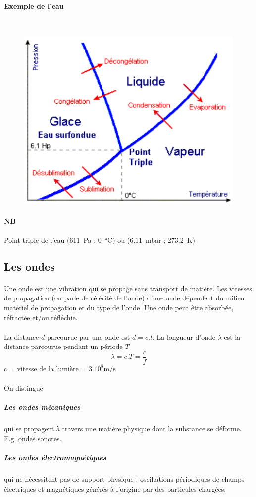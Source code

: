 \documentclass{article}
\begin{document}
            \paragraph{Exemple de l'eau}
            \
            \begin{figure}[H]
            \centering
                \includegraphics[width=0.45\linewidth]{./images/015-diagramme-phase-eau.png}
            \end{figure}

            \paragraph{NB}
            Point triple de l'eau (\SI{611}{\pascal} ; \SI{0}{\celsius}) ou (\SI{6,11}{\milli\bar} ; \SI{273,2}{\kelvin})

        \subsection{Les ondes}
            \paragraph{}
            Une onde est une vibration qui se propage sans transport de matière. Les vitesses de propagation (on parle de célérité de l'onde) d'une onde dépendent du milieu matériel de propagation et du type de l'onde. Une onde peut être absorbée, réfractée et/ou réfléchie.

            \paragraph{}
            La distance $d$ parcourue par une onde est $d = c.t$. La longueur d'onde $\lambda$ est la distance parcourue pendant un période $T$
            $$\lambda = c.T = \frac{c}{f}$$
            c = vitesse de la lumière = $3.10^8\si{\meter\per\second}$

            \paragraph{}
            On distingue
                \subparagraph{Les ondes mécaniques} qui se propagent à travers une matière physique dont la substance se déforme. E.g. ondes sonores.
                \subparagraph{Les ondes électromagnétiques} qui ne nécessitent pas de support physique : oscillations périodiques de champs électriques et magnétiques générés à l'origine par des particules chargées.
\end{document}
